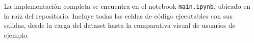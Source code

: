 La implementación completa se encuentra en el notebook \texttt{main.ipynb}, ubicado en la raíz del repositorio. Incluye todas las celdas de código ejecutables con sus salidas, desde la carga del dataset hasta la comparativa visual de usuarios de ejemplo.
